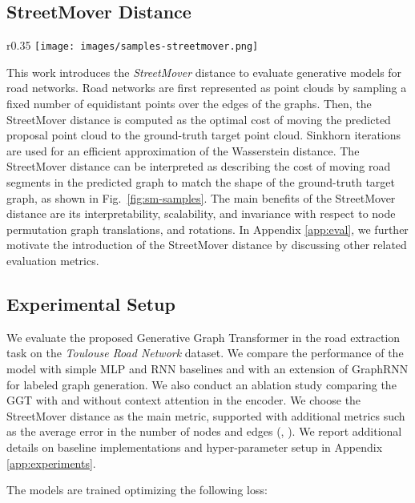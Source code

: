 \documentclass{article}
\begin{document}
\subsection{StreetMover Distance}


\begin{wrapfigure}{r}{0.35\textwidth}
\centering
    \vskip -0.15in
    \texttt{[image: images/samples-streetmover.png]}
    \caption{Examples of StreetMover distances between several graphs.}
    \vskip -0.15in
    \label{fig:sm-samples}
\end{wrapfigure}

This work introduces the \textit{StreetMover} distance to evaluate generative models for road networks. Road networks are first represented as point clouds by sampling a fixed number of equidistant points over the edges of the graphs. Then, the StreetMover distance is computed as the optimal cost of moving the predicted proposal point cloud to the ground-truth target point cloud. Sinkhorn iterations \citep{cuturi2013sinkhorn} are used for an efficient approximation of the Wasserstein distance. The StreetMover distance can be interpreted as describing the cost of moving road segments in the predicted graph to match the shape of the ground-truth target graph, as shown in Fig.~\ref{fig:sm-samples}.
The main benefits of the StreetMover distance are its interpretability, scalability, and invariance with respect to node permutation graph translations, and rotations. In Appendix \ref{app:eval}, we further motivate the introduction of the StreetMover distance by discussing other related evaluation metrics.

\subsection{Experimental Setup}
We evaluate the proposed Generative Graph Transformer in the road extraction task on the \textit{Toulouse Road Network} dataset. We compare the performance of the model with simple MLP and RNN baselines and with an extension of GraphRNN \citep{you2018graphrnn} for labeled graph generation. We also conduct an ablation study comparing the GGT with and without context attention in the encoder. We choose the StreetMover distance as the main metric, supported with additional metrics such as the average error in the number of nodes and edges (, ). 
We report additional details on baseline implementations and hyper-parameter setup in Appendix \ref{app:experiments}.

The models are trained optimizing the following loss:
\end{document}
